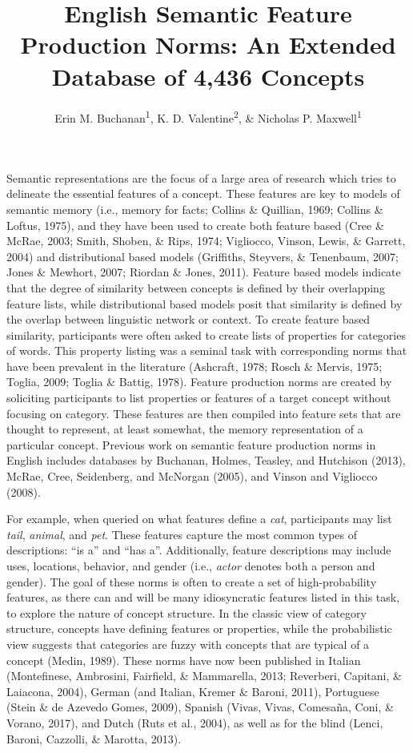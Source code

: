 \documentclass[english,,man]{apa6}
\title{English Semantic Feature Production Norms: An Extended Database of 4,436
Concepts}
\author{Erin M. Buchanan\textsuperscript{1}, K. D. Valentine\textsuperscript{2},
\& Nicholas P. Maxwell\textsuperscript{1}}
\date{}
\affiliation{
\vspace{0.5cm}
\textsuperscript{1} Missouri State University\\\textsuperscript{2} University of Missouri}
\theoremstyle{definition}
\theoremstyle{definition}
\theoremstyle{definition}
\theoremstyle{remark}
\begin{document}
\maketitle

Semantic representations are the focus of a large area of research which
tries to delineate the essential features of a concept. These features
are key to models of semantic memory (i.e., memory for facts; Collins \&
Quillian, 1969; Collins \& Loftus, 1975), and they have been used to
create both feature based (Cree \& McRae, 2003; Smith, Shoben, \& Rips,
1974; Vigliocco, Vinson, Lewis, \& Garrett, 2004) and distributional
based models (Griffiths, Steyvers, \& Tenenbaum, 2007; Jones \& Mewhort,
2007; Riordan \& Jones, 2011). Feature based models indicate that the
degree of similarity between concepts is defined by their overlapping
feature lists, while distributional based models posit that similarity
is defined by the overlap between linguistic network or context. To
create feature based similarity, participants were often asked to create
lists of properties for categories of words. This property listing was a
seminal task with corresponding norms that have been prevalent in the
literature (Ashcraft, 1978; Rosch \& Mervis, 1975; Toglia, 2009; Toglia
\& Battig, 1978). Feature production norms are created by soliciting
participants to list properties or features of a target concept without
focusing on category. These features are then compiled into feature sets
that are thought to represent, at least somewhat, the memory
representation of a particular concept. Previous work on semantic
feature production norms in English includes databases by Buchanan,
Holmes, Teasley, and Hutchison (2013), McRae, Cree, Seidenberg, and
McNorgan (2005), and Vinson and Vigliocco (2008).

For example, when queried on what features define a \emph{cat},
participants may list \emph{tail}, \emph{animal}, and \emph{pet}. These
features capture the most common types of descriptions: \enquote{is a}
and \enquote{has a}. Additionally, feature descriptions may include
uses, locations, behavior, and gender (i.e., \emph{actor} denotes both a
person and gender). The goal of these norms is often to create a set of
high-probability features, as there can and will be many idiosyncratic
features listed in this task, to explore the nature of concept
structure. In the classic view of category structure, concepts have
defining features or properties, while the probabilistic view suggests
that categories are fuzzy with concepts that are typical of a concept
(Medin, 1989). These norms have now been published in Italian
(Montefinese, Ambrosini, Fairfield, \& Mammarella, 2013; Reverberi,
Capitani, \& Laiacona, 2004), German (and Italian, Kremer \& Baroni,
2011), Portuguese (Stein \& de Azevedo Gomes, 2009), Spanish (Vivas,
Vivas, Comesaña, Coni, \& Vorano, 2017), and Dutch (Ruts et al., 2004),
as well as for the blind (Lenci, Baroni, Cazzolli, \& Marotta, 2013).
\end{document}
